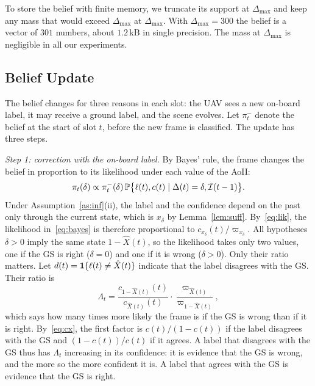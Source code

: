 To store the belief with finite memory, we truncate its support at $\Delta_{\max}$ and keep any mass that would exceed $\Delta_{\max}$ at $\Delta_{\max}$. With $\Delta_{\max}=300$ the belief is a vector of $301$ numbers, about $1.2$\,kB in single precision. The mass at $\Delta_{\max}$ is negligible in all our experiments.

\subsection{Belief Update}
The belief changes for three reasons in each slot: the UAV sees a new on-board label, it may receive a ground label, and the scene evolves. Let $\pi^-_t$ denote the belief at the start of slot $t$, before the new frame is classified. The update has three steps.

\emph{Step 1: correction with the on-board label.} By Bayes' rule, the frame changes the belief in proportion to its likelihood under each value of the AoII:
\begin{equation}\label{eq:bayes}
\pi_t(\delta)\propto\pi^-_t(\delta)\,\mathbb{P}\big\{\ell(t),c(t)\mid\Delta(t)=\delta,\mathcal{I}(t-1)\big\}.
\end{equation}
Under Assumption~\ref{as:inf}(ii), the label and the confidence depend on the past only through the current state, which is $x_\delta$ by Lemma~\ref{lem:suff}. By~\eqref{eq:lik}, the likelihood in~\eqref{eq:bayes} is therefore proportional to $c_{x_\delta}(t)/\varpi_{x_\delta}$. All hypotheses $\delta>0$ imply the same state $1-\hat X(t)$, so the likelihood takes only two values, one if the GS is right ($\delta=0$) and one if it is wrong ($\delta>0$). Only their ratio matters. Let $d(t)=\mathbf{1}\{\ell(t)\neq\hat X(t)\}$ indicate that the label disagrees with the GS. Their ratio is
\begin{equation}\label{eq:Lambda}
\Lambda_t=\frac{c_{1-\hat X(t)}(t)}{c_{\hat X(t)}(t)}\cdot\frac{\varpi_{\hat X(t)}}{\varpi_{1-\hat X(t)}},
\end{equation}
which says how many times more likely the frame is if the GS is wrong than if it is right. By~\eqref{eq:cx}, the first factor is $c(t)/(1-c(t))$ if the label disagrees with the GS and $(1-c(t))/c(t)$ if it agrees. A label that disagrees with the GS thus has $\Lambda_t$ increasing in its confidence: it is evidence that the GS is wrong, and the more so the more confident it is. A label that agrees with the GS is evidence that the GS is right.

